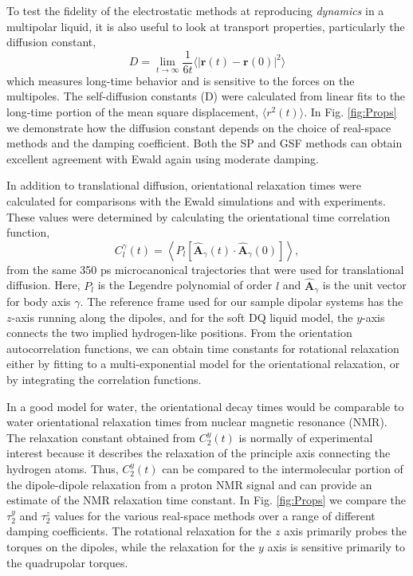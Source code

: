 To test the fidelity of the electrostatic methods at reproducing
\textit{dynamics} in a multipolar liquid, it is also useful to look at
transport properties, particularly the diffusion constant,
\begin{equation}
D = \lim_{t \rightarrow \infty} \frac{1}{6 t} \langle \left|
  \mathbf{r}(t) -\mathbf{r}(0) \right|^2 \rangle
\label{eq:diff}
\end{equation}
which measures long-time behavior and is sensitive to the forces on
the multipoles. The self-diffusion constants (D) were calculated from
linear fits to the long-time portion of the mean square displacement,
$\langle r^{2}(t) \rangle$.\cite{Allen89} In Fig. \ref{fig:Props} we
demonstrate how the diffusion constant depends on the choice of
real-space methods and the damping coefficient.  Both the SP and GSF
methods can obtain excellent agreement with Ewald again using moderate
damping.

In addition to translational diffusion, orientational relaxation times
were calculated for comparisons with the Ewald simulations and with
experiments. These values were determined by calculating the
orientational time correlation function,
\begin{equation}
C_l^\gamma(t) = \left\langle P_l\left[\hat{\mathbf{A}}_\gamma(t)
                \cdot\hat{\mathbf{A}}_\gamma(0)\right]\right\rangle,
\label{eq:OrientCorr}
\end{equation}
from the same 350 ps microcanonical trajectories that were used for
translational diffusion.  Here, $P_l$ is the Legendre polynomial of
order $l$ and $\hat{\mathbf{A}}_\gamma$ is the unit vector for body
axis $\gamma$.  The reference frame used for our sample dipolar
systems has the $z$-axis running along the dipoles, and for the soft
DQ liquid model, the $y$-axis connects the two implied hydrogen-like
positions.  From the orientation autocorrelation functions, we can
obtain time constants for rotational relaxation either by fitting to a
multi-exponential model for the orientational relaxation, or by
integrating the correlation functions.

In a good model for water, the orientational decay times would be
comparable to water orientational relaxation times from nuclear
magnetic resonance (NMR). The relaxation constant obtained from
$C_2^y(t)$ is normally of experimental interest because it describes
the relaxation of the principle axis connecting the hydrogen
atoms. Thus, $C_2^y(t)$ can be compared to the intermolecular portion
of the dipole-dipole relaxation from a proton NMR signal and can
provide an estimate of the NMR relaxation time constant.\cite{Impey82}
In Fig. \ref{fig:Props} we compare the $\tau_2^y$ and $\tau_2^z$
values for the various real-space methods over a range of different
damping coefficients.  The rotational relaxation for the $z$ axis
primarily probes the torques on the dipoles, while the relaxation for
the $y$ axis is sensitive primarily to the quadrupolar torques.

